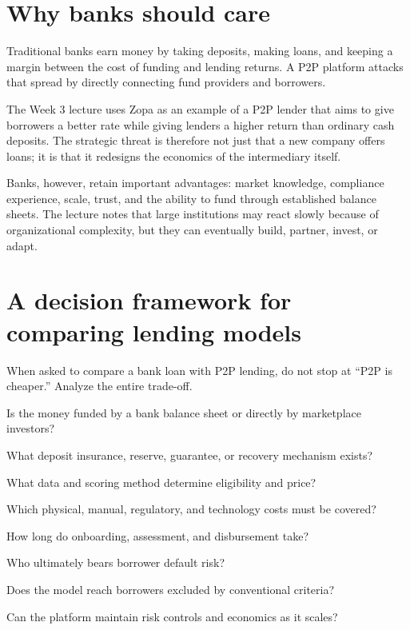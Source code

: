 \section{Why banks should care}

Traditional banks earn money by taking deposits, making loans, and keeping a margin between the cost of funding and lending returns. A P2P platform attacks that spread by directly connecting fund providers and borrowers.

The Week 3 lecture uses Zopa as an example of a P2P lender that aims to give borrowers a better rate while giving lenders a higher return than ordinary cash deposits. The strategic threat is therefore not just that a new company offers loans; it is that it redesigns the economics of the intermediary itself.

Banks, however, retain important advantages: market knowledge, compliance experience, scale, trust, and the ability to fund through established balance sheets. The lecture notes that large institutions may react slowly because of organizational complexity, but they can eventually build, partner, invest, or adapt.

\section{A decision framework for comparing lending models}

When asked to compare a bank loan with P2P lending, do not stop at ``P2P is cheaper.'' Analyze the entire trade-off.

\begin{mlsteps}
  \item {} Is the money funded by a bank balance sheet or directly by marketplace investors?
  \item {} What deposit insurance, reserve, guarantee, or recovery mechanism exists?
  \item {} What data and scoring method determine eligibility and price?
  \item {} Which physical, manual, regulatory, and technology costs must be covered?
  \item {} How long do onboarding, assessment, and disbursement take?
  \item {} Who ultimately bears borrower default risk?
  \item {} Does the model reach borrowers excluded by conventional criteria?
  \item {} Can the platform maintain risk controls and economics as it scales?
\end{mlsteps}

